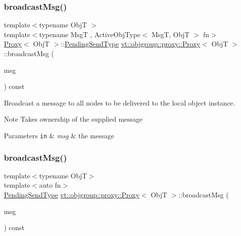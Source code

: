 \subsubsection{\texorpdfstring{broadcast\+Msg()}{broadcastMsg()}\hspace{0.1cm}{\footnotesize\ttfamily [1/2]}}
{\footnotesize\ttfamily template$<$typename ObjT $>$ \\
template$<$typename MsgT , Active\+Obj\+Type$<$ Msg\+T, Obj\+T $>$ fn$>$ \\
\hyperlink{structvt_1_1objgroup_1_1proxy_1_1_proxy}{Proxy}$<$ ObjT $>$\+::\hyperlink{structvt_1_1objgroup_1_1proxy_1_1_proxy_a1bdf8713203531d306702a024872bb08}{Pending\+Send\+Type} \hyperlink{structvt_1_1objgroup_1_1proxy_1_1_proxy}{vt\+::objgroup\+::proxy\+::\+Proxy}$<$ ObjT $>$\+::broadcast\+Msg (\begin{DoxyParamCaption}\item[{\hyperlink{structvt_1_1messaging_1_1_msg_ptr_thief}{messaging\+::\+Msg\+Ptr\+Thief}$<$ MsgT $>$}]{msg }\end{DoxyParamCaption}) const}



Broadcast a message to all nodes to be delivered to the local object instance. 

\begin{DoxyNote}{Note}
Takes ownership of the supplied message
\end{DoxyNote}

\begin{DoxyParams}[1]{Parameters}
\mbox{\tt in}  & {\em msg} & the message \\
\hline
\end{DoxyParams}
\mbox{\label{structvt_1_1objgroup_1_1proxy_1_1_proxy_a698e8e08cbcae5d69f3ad6ae51f10862}} 
\subsubsection{\texorpdfstring{broadcast\+Msg()}{broadcastMsg()}\hspace{0.1cm}{\footnotesize\ttfamily [2/2]}}
{\footnotesize\ttfamily template$<$typename ObjT$>$ \\
template$<$auto fn$>$ \\
\hyperlink{structvt_1_1objgroup_1_1proxy_1_1_proxy_a1bdf8713203531d306702a024872bb08}{Pending\+Send\+Type} \hyperlink{structvt_1_1objgroup_1_1proxy_1_1_proxy}{vt\+::objgroup\+::proxy\+::\+Proxy}$<$ ObjT $>$\+::broadcast\+Msg (\begin{DoxyParamCaption}\item[{\hyperlink{structvt_1_1messaging_1_1_msg_ptr_thief}{messaging\+::\+Msg\+Ptr\+Thief}$<$ typename \hyperlink{structvt_1_1_obj_func_traits}{Obj\+Func\+Traits}$<$ decltype(fn)$>$\+::MsgT $>$}]{msg }\end{DoxyParamCaption}) const\hspace{0.3cm}{\ttfamily [inline]}}



